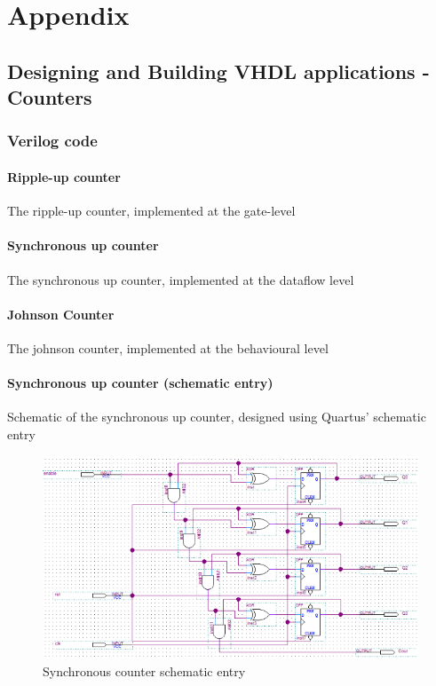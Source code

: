 \documentclass{article}
\begin{document}
\section{Appendix}
\subsection{Designing and Building VHDL applications - Counters}

	\subsubsection{Verilog code}

	\paragraph{Ripple-up counter} The ripple-up counter, implemented at the gate-level
	
	

	\paragraph{Synchronous up counter} The synchronous up counter, implemented at the dataflow level
	
	

	\paragraph{Johnson Counter} The johnson counter, implemented at the behavioural level
	
	

	\paragraph{Synchronous up counter (schematic entry)} Schematic of the synchronous up counter, designed using Quartus' schematic entry

	\begin{figure}[H]
		\centering
		\includegraphics[width=0.75\linewidth]{figures/schem_synUp.png}
		\caption{Synchronous counter schematic entry}
		\label{fig:synUp_schem}
	\end{figure}
\end{document}
